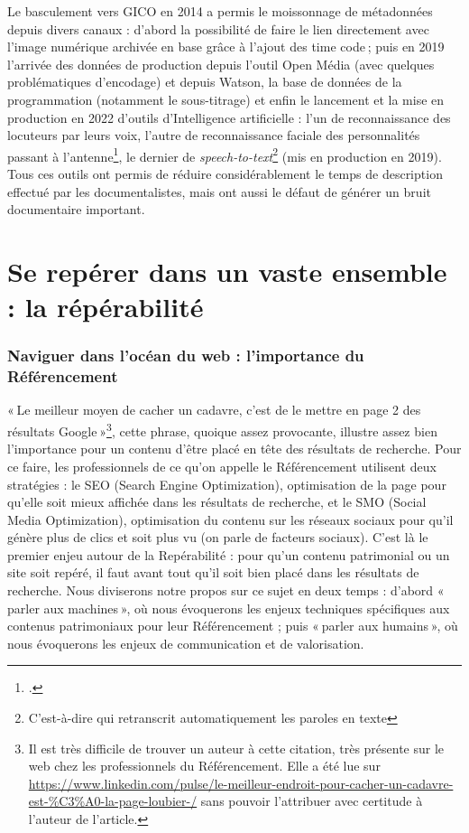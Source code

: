 Le basculement vers GICO en 2014 a permis le moissonnage de métadonnées depuis divers canaux : d’abord la possibilité de faire le lien directement avec l’image numérique archivée en base grâce à l’ajout des time code ; puis en 2019 l’arrivée des données de production depuis l’outil Open Média (avec quelques problématiques d’encodage) et depuis Watson, la base de données de la programmation (notamment le sous-titrage) et enfin le lancement et la mise en production en 2022 d’outils d’Intelligence artificielle : l’un de reconnaissance des locuteurs par leurs voix, l’autre de reconnaissance faciale des personnalités passant à l’antenne\footcite{sonderegger2024}, le dernier de \textit{speech-to-text}\footnote{C'est-à-dire qui retranscrit automatiquement les paroles en texte} (mis en production en 2019). Tous ces outils ont permis de réduire considérablement le temps de description effectué par les documentalistes, mais ont aussi le défaut de générer un bruit documentaire important.


\chapter{Se repérer dans un vaste ensemble : la répérabilité}

\subsection{Naviguer dans l'océan du web : l'importance du Référencement}

« Le meilleur moyen de cacher un cadavre, c’est de le mettre en page 2 des résultats Google »\footnote{Il est très difficile de trouver un auteur à cette citation, très présente sur le web chez les professionnels du Référencement. Elle a été lue sur \url{https://www.linkedin.com/pulse/le-meilleur-endroit-pour-cacher-un-cadavre-est-\%C3\%A0-la-page-loubier-/} sans pouvoir l’attribuer avec certitude à l’auteur de l’article.}, cette phrase, quoique assez provocante, illustre assez bien l’importance pour un contenu d’être placé en tête des résultats de recherche. Pour ce faire, les professionnels de ce qu’on appelle le Référencement utilisent deux stratégies : le SEO (Search Engine Optimization), optimisation de la page pour qu’elle soit mieux affichée dans les résultats de recherche, et le SMO (Social Media Optimization), optimisation du contenu sur les réseaux sociaux pour qu’il génère plus de clics et soit plus vu (on parle de facteurs sociaux). C’est là le premier enjeu autour de la Repérabilité : pour qu’un contenu patrimonial ou un site soit repéré, il faut avant tout qu’il soit bien placé dans les résultats de recherche. Nous diviserons notre propos sur ce sujet en deux temps : d’abord « parler aux machines », où nous évoquerons les enjeux techniques spécifiques aux contenus patrimoniaux pour leur Référencement ; puis « parler aux humains », où nous évoquerons les enjeux de communication et de valorisation. 

